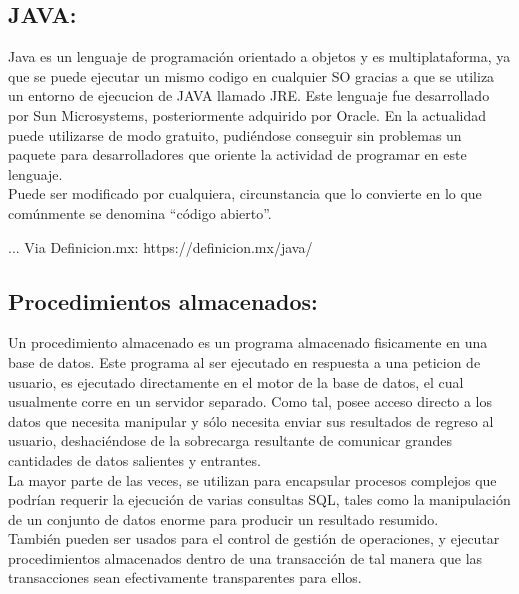 \documentclass[spanish]{article}
\begin{document}
\subsection{JAVA:} 

Java es un lenguaje de programación orientado a objetos y es multiplataforma, ya que se puede ejecutar un mismo codigo en cualquier SO gracias a que se utiliza un entorno de ejecucion de JAVA llamado JRE.
Este lenguaje fue desarrollado por Sun Microsystems, posteriormente adquirido por Oracle. En la actualidad puede utilizarse de modo gratuito, pudiéndose conseguir sin problemas un paquete para desarrolladores que oriente la actividad de programar en este lenguaje. \\

 Puede ser modificado por cualquiera, circunstancia que lo convierte en lo que comúnmente se denomina “código abierto”.

... Via Definicion.mx: https://definicion.mx/java/


\subsection{Procedimientos almacenados:}

Un procedimiento almacenado es un programa almacenado fisicamente en una base de datos.
Este programa al ser ejecutado en respuesta a una peticion de usuario, es ejecutado directamente en el motor de la base de datos, el cual usualmente corre en un servidor separado. Como tal, posee acceso directo a los datos que necesita manipular y sólo necesita enviar sus resultados de regreso al usuario, deshaciéndose de la sobrecarga resultante de comunicar grandes cantidades de datos salientes y entrantes. \\

La mayor parte de las veces, se utilizan para encapsular procesos complejos que podrían requerir  la ejecución de varias consultas SQL, tales como la manipulación de un conjunto de datos enorme para producir un resultado resumido. \\

También pueden ser usados para el control de gestión de operaciones, y ejecutar procedimientos almacenados dentro de una transacción de tal manera que las transacciones sean efectivamente transparentes para ellos. \\
\end{document}
